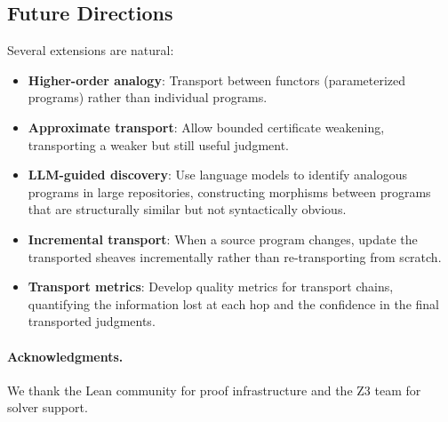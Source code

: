 \documentclass[11pt]{article}
\begin{document}
\subsection{Future Directions}

Several extensions are natural:
\begin{itemize}[noitemsep]
  \item \textbf{Higher-order analogy}: Transport between functors
        (parameterized programs) rather than individual programs.
  \item \textbf{Approximate transport}: Allow bounded certificate
        weakening, transporting a weaker but still useful judgment.
  \item \textbf{LLM-guided discovery}: Use language models to
        identify analogous programs in large repositories,
        constructing morphisms between programs that are
        structurally similar but not syntactically obvious.
  \item \textbf{Incremental transport}: When a source program
        changes, update the transported sheaves incrementally
        rather than re-transporting from scratch.
  \item \textbf{Transport metrics}: Develop quality metrics for
        transport chains, quantifying the information lost at
        each hop and the confidence in the final transported
        judgments.
\end{itemize}

\paragraph{Acknowledgments.}
We thank the Lean community for proof infrastructure and the Z3 team
for solver support.
\end{document}
